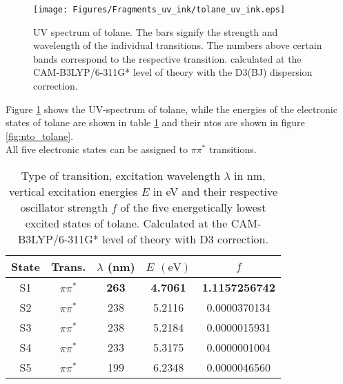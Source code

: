 \vspace{1 cm}
%
%
%
\begin{figure}[H]
    \centering
    \texttt{[image: Figures/Fragments\_uv\_ink/tolane\_uv\_ink.eps]}
    \caption{UV spectrum of tolane. The bars signify the strength and wavelength of the individual transitions. The numbers above certain bands correspond to the respective transition. calculated at the CAM-B3LYP/6-311G* level of theory with the D3(BJ) dispersion correction.}
    \label{fig:uv_fig_tolane}
\end{figure}
%
%
%
Figure \ref{fig:uv_fig_tolane} shows the UV-spectrum of tolane, while the energies of the electronic states of tolane are shown in table \ref{tab:excited_states_tolane} and their ntos are shown in figure \ref{fig:nto_tolane}.\\
All five electronic states can be assigned to $\pi\pi^*$ transitions.
%
%
%
\begin{table}[H]
\caption{Type of transition, excitation wavelength $\lambda$ in nm, vertical excitation energies $E$ in eV and their respective oscillator strength $f$ of the five energetically lowest excited states of tolane. Calculated at the CAM-B3LYP/6-311G* level of theory with D3 correction.}
\label{tab:excited_states_tolane}
\vspace{0.1 cm}
\centering
\begin{tabular}{ccccc}
\toprule
State & Trans. & $\lambda$ (nm)     & $E$ $\left(\si{\eV}\right)$          & $f$    \\
\midrule
S1    & $\pi\pi^*$	& \textbf{263}    & \textbf{4.7061}        & \textbf{1.1157256742} \\
S2    & $\pi\pi^*$	& 238             & 5.2116                 & 0.0000370134          \\
S3    & $\pi\pi^*$	& 238             & 5.2184                 & 0.0000015931          \\
S4    & $\pi\pi^*$	& 233             & 5.3175                 & 0.0000001004          \\
S5    & $\pi\pi^*$	& 199             & 6.2348                 & 0.0000046560         \\
\bottomrule
\end{tabular}
\end{table}
%
%
%
